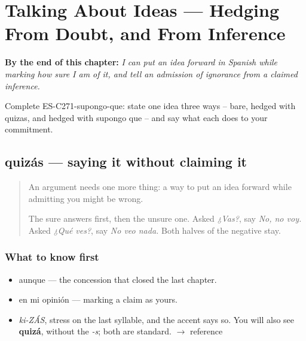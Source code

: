 
\chapter{Talking About Ideas --- Hedging From Doubt, and From Inference}
\label{ch:ideas}

\begin{chapteropening}
\textbf{By the end of this chapter:} \emph{I can put an idea forward in Spanish while marking how sure I am of it, and tell an admission of ignorance from a claimed inference.}

Complete ES-C271-supongo-que: state one idea three ways -- bare, hedged with quizas, and hedged with supongo que -- and say what each does to your commitment.
\end{chapteropening}

\section[quizás]{quizás — saying it without claiming it}

\label{lesson:ES-C271-quizas}



\begin{quote}
An argument needs one more thing: a way to put an idea forward while admitting you might be wrong.

The sure answers first, then the unsure one. Asked \emph{¿Vas?}, say \emph{No, no voy.} Asked \emph{¿Qué ves?}, say \emph{No veo nada.} Both halves of the negative stay.
\end{quote}

\subsection*{What to know first}
\begin{itemize}
\raggedright
  \item aunque — the concession that closed the last chapter.
  \item en mi opinión — marking a claim as yours.
\end{itemize}

\begin{sounds}
\begin{itemize}
\raggedright
  \item \emph{ki-ZÁS}, stress on the last syllable, and the accent says so. You will also see \textbf{quizá}, without the \emph{-s}; both are standard. $\to$ reference
\end{itemize}
\end{sounds}


